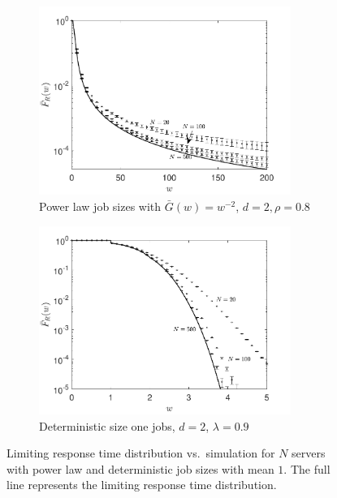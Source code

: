 \documentclass[12pt]{report}
\begin{document}
\begin{figure}[t]
\begin{center}
\begin{subfigure}{.45\textwidth}
\centering
\includegraphics[width=0.9\textwidth]{figures/Chapter2/fig3_7a.pdf}
\caption{Power law job sizes with $\bar{G}(w) = w^{-2}$, $d=2, \rho = 0.8$}
\label{fig:validatePOW}
\end{subfigure}
\begin{subfigure}{.45\textwidth}
\centering
\includegraphics[width=0.9\textwidth]{figures/Chapter2/fig3_7b.pdf}
\caption{Deterministic size one jobs, $d = 2$, $\lambda = 0.9$}
\label{fig:validateDET}
\end{subfigure}
\caption{Limiting response time distribution vs.~simulation 
for $N$ servers with power law and deterministic job sizes with mean $1$.
The full line represents the limiting response time distribution.}
\label{fig:validatePOWDET}
\end{center}
\end{figure}
\end{document}
